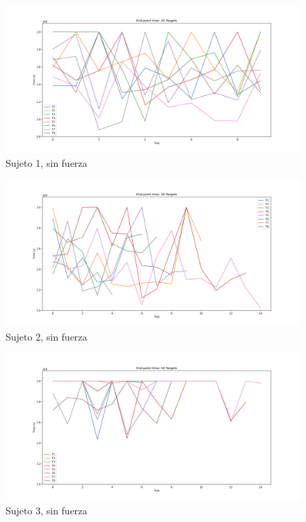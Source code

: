 \documentclass[a4paper,11pt, oneside]{book}
\begin{document}
\begin{figure}[H]
	\includegraphics[width=\linewidth]{sujeto1/no_force/evolution_time}
	\caption{Sujeto 1, sin fuerza}
	\label{1-1-3}
\end{figure}
\begin{figure}[H]
	\includegraphics[width=\linewidth]{sujeto2/no_force/evolution_time}
	\caption{Sujeto 2, sin fuerza}
	\label{2-1-3}
\end{figure}
\begin{figure}[H]
	\includegraphics[width=\linewidth]{sujeto3/no_force/evolution_time}
	\caption{Sujeto 3, sin fuerza}
	\label{3-1-3}
\end{figure}
\end{document}

